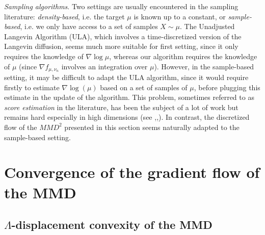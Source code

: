 \textit{Sampling algorithms}. Two settings are usually encountered in the sampling literature: \textit{density-based}, i.e. the target $\mu$ is known up to a constant, or \textit{sample-based}, i.e. we only have access to a set of samples $X \sim \mu$.
	The Unadjusted Langevin Algorithm (ULA), which involves a time-discretized version of the Langevin diffusion, seems much more suitable for first setting, since it only requires the knowledge of $\nabla \log \mu$, whereas our algorithm requires the knowledge of $\mu$ (since $\nabla f_{\mu, \nu_n}$ involves an integration over $\mu$). However, in the sample-based setting, it may be difficult to adapt the ULA algorithm, since it would require firstly to estimate $\nabla \log(\mu)$ based on a set of samples of $\mu$, before plugging this estimate in the update of the algorithm. This problem, sometimes referred to as \textit{score estimation} in the literature, has been the subject of a lot of work but remains hard especially in high dimensions (see \cite{sutherland2017efficient},\cite{li2018gradient},\cite{shi2018spectral}). In contrast, the discretized flow of the $MMD^2$ presented in this section seems naturally adapted to the sample-based setting.







\section{Convergence of the gradient flow of the MMD}
\subsection{$\Lambda$-displacement convexity of the MMD}

